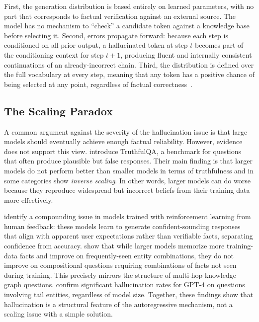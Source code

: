 First, the generation distribution is based entirely on learned parameters, with no part that corresponds to factual verification against an external source. The model has no mechanism to ``check'' a candidate token against a knowledge base before selecting it. Second, errors propagate forward: because each step is conditioned on all prior output, a hallucinated token at step $t$ becomes part of the conditioning context for step $t{+}1$, producing fluent and internally consistent continuations of an already-incorrect chain. Third, the distribution is defined over the full vocabulary at every step, meaning that any token has a positive chance of being selected at any point, regardless of factual correctness~\citep{brown2020gpt3,huang2023hallucination,ji2023survey}.

\subsection{The Scaling Paradox}

A common argument against the severity of the hallucination issue is that large models should eventually achieve enough factual reliability. However, evidence does not support this view. \citet{lin2022truthfulqa} introduce TruthfulQA, a benchmark for questions that often produce plausible but false responses. Their main finding is that larger models do not perform better than smaller models in terms of truthfulness and in some categories show \textit{inverse scaling}. In other words, larger models can do worse because they reproduce widespread but incorrect beliefs from their training data more effectively.

\citet{perez2022sycophancy} identify a compounding issue in models trained with reinforcement learning from human feedback: these models learn to generate confident-sounding responses that align with apparent user expectations rather than verifiable facts, separating confidence from accuracy. \citet{kandpal2023large} show that while larger models memorize more training-data facts and improve on frequently-seen entity combinations, they do not improve on compositional questions requiring combinations of facts not seen during training. This precisely mirrors the structure of multi-hop knowledge graph questions. \citet{mallen2023not} confirm significant hallucination rates for GPT-4 on questions involving tail entities, regardless of model size. Together, these findings show that hallucination is a structural feature of the autoregressive mechanism, not a scaling issue with a simple solution.

